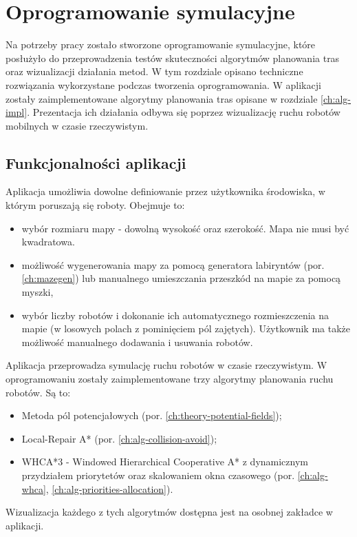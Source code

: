 \chapter{Oprogramowanie symulacyjne}
\label{ch:simulation-app}

Na potrzeby pracy zostało stworzone oprogramowanie symulacyjne, które posłużyło do przeprowadzenia testów skuteczności algorytmów planowania tras oraz wizualizacji działania metod.
W tym rozdziale opisano techniczne rozwiązania wykorzystane podczas tworzenia oprogramowania.
W aplikacji zostały zaimplementowane algorytmy planowania tras opisane w rozdziale \ref{ch:alg-impl}.
Prezentacja ich działania odbywa się poprzez wizualizację ruchu robotów mobilnych w czasie rzeczywistym. 

\section{Funkcjonalności aplikacji}
Aplikacja umożliwia dowolne definiowanie przez użytkownika środowiska, w którym poruszają się roboty. Obejmuje to:
\begin{itemize}
	\item wybór rozmiaru mapy - dowolną wysokość oraz szerokość. Mapa nie musi być kwadratowa.
	\item możliwość wygenerowania mapy za pomocą generatora labiryntów (por. \ref{ch:mazegen}) lub manualnego umieszczania przeszkód na mapie za pomocą myszki,
	\item wybór liczby robotów i dokonanie ich automatycznego rozmieszczenia na mapie (w losowych polach z pominięciem pól zajętych). Użytkownik ma także możliwość manualnego dodawania i usuwania robotów.
\end{itemize}

Aplikacja przeprowadza symulację ruchu robotów w czasie rzeczywistym. W oprogramowaniu zostały zaimplementowane trzy algorytmy planowania ruchu robotów. Są to:
\begin{itemize}
	\item Metoda pól potencjałowych (por. \ref{ch:theory-potential-fields});
	\item Local-Repair A* (por. \ref{ch:alg-collision-avoid});
	\item WHCA*3 - Windowed Hierarchical Cooperative A* z dynamicznym przydziałem priorytetów oraz skalowaniem okna czasowego (por. \ref{ch:alg-whca}, \ref{ch:alg-priorities-allocation}).
\end{itemize}
Wizualizacja każdego z tych algorytmów dostępna jest na osobnej zakładce w aplikacji.
